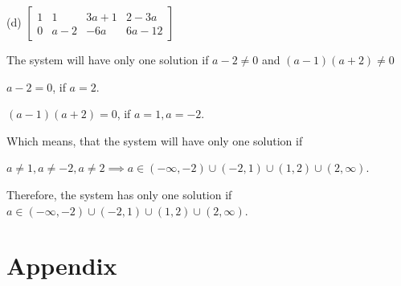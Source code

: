 \documentclass{article}
\begin{document}
\begin{enumerate}
(d) $\left[\begin{array}{ccc|c}1 & 1 & 3 a+1 & 2-3 a \\ 0 & a-2 & -6 a & 6 a-12\end{array}\right]$

The system will have only one solution if $a-2 \neq 0$ and $(a-1)(a+2) \neq 0$

$a-2=0$, if $a=2$.

$(a-1)(a+2)=0$, if $a=1, a=-2$.

Which means, that the system will have only one solution if 

$a \neq 1, a \neq-2, a \neq 2 \implies a \in(-\infty,-2) \cup(-2,1) \cup(1,2) \cup(2, \infty)$.

Therefore, the system has only one solution if $a \in(-\infty,-2) \cup(-2,1) \cup(1,2) \cup(2, \infty)$.

\end{enumerate}





\appendix

\section{Appendix}
\end{document}
